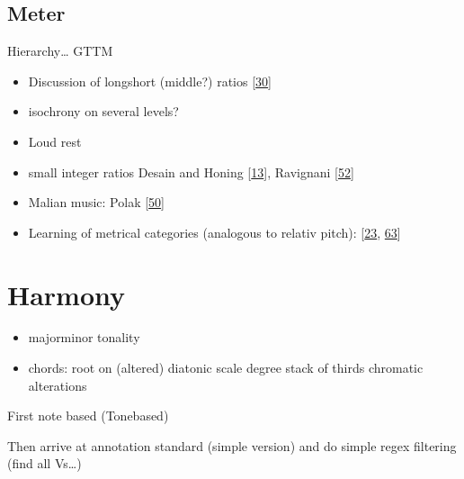 \documentclass[letterpaper,10pt,english]{sphinxmanual}
\begin{document}
\section{Meter}
\label{\detokenize{4_time:meter}}
\sphinxAtStartPar
Hierarchy… GTTM
\begin{itemize}
\item {} 
\sphinxAtStartPar
Discussion of long\sphinxhyphen{}short (middle?) ratios {[}\hyperlink{cite.8_bibliography:id8}{30}{]}

\item {} 
\sphinxAtStartPar
isochrony on several levels?

\item {} 
\sphinxAtStartPar
Loud rest

\item {} 
\sphinxAtStartPar
small integer ratios Desain and Honing {[}\hyperlink{cite.8_bibliography:id11}{13}{]}, Ravignani  {[}\hyperlink{cite.8_bibliography:id9}{52}{]}

\item {} 
\sphinxAtStartPar
Malian music: Polak  {[}\hyperlink{cite.8_bibliography:id7}{50}{]}

\item {} 
\sphinxAtStartPar
Learning of metrical categories (analogous to relativ pitch): {[}\hyperlink{cite.8_bibliography:id37}{23}, \hyperlink{cite.8_bibliography:id38}{63}{]}

\end{itemize}


\chapter{Harmony}
\label{\detokenize{4_harmony:harmony}}\label{\detokenize{4_harmony::doc}}\begin{itemize}
\item {} 
\sphinxAtStartPar
major\sphinxhyphen{}minor tonality

\item {} 
\sphinxAtStartPar
chords:
\sphinxhyphen{} root on (altered) diatonic scale degree
\sphinxhyphen{} stack of thirds
\sphinxhyphen{} chromatic alterations

\end{itemize}

\sphinxAtStartPar
First note based (Tone\sphinxhyphen{}based)

\sphinxAtStartPar
Then arrive at annotation standard (simple version)
and do simple regex filtering (find all Vs…)
\end{document}
